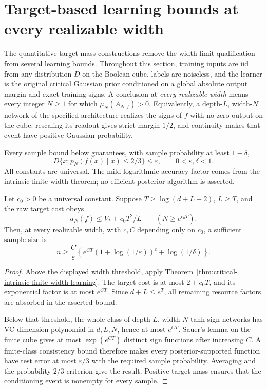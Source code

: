 \section{Target-based learning bounds at every realizable width}
\label{sec:critical-all-width-target-learning}

The quantitative target-mass constructions remove the width-limit
qualification from several learning bounds. Throughout this section,
training inputs are iid from any distribution $D$ on the Boolean cube,
labels are noiseless, and the learner is the original critical Gaussian
prior conditioned on a global absolute output margin and exact training
signs. A conclusion at \emph{every realizable width} means every integer
$N\ge1$ for which $\mu_N(A_{N,f})>0$. Equivalently, a depth-$L$,
width-$N$ network of the specified architecture realizes the signs of $f$
with no zero output on the cube: rescaling its readout gives strict margin
$1/2$, and continuity makes that event have positive Gaussian probability.

Every sample bound below guarantees, with sample probability at least
$1-\delta$,
\[
 D\{x:p_N(f(x)\mid x)\le2/3\}\le\varepsilon,
 \qquad 0<\varepsilon,\delta<1.
\]
All constants are universal. The mild logarithmic accuracy factor comes
from the intrinsic finite-width theorem; no efficient posterior algorithm
is asserted.

\begin{lemma}
\label{lem:critical-mass-to-all-width-learning}
Let $c_0>0$ be a universal constant. Suppose $T\ge\log(d+L+2)$,
$L\ge T$, and the raw target cost obeys
\[
 a_N(f)\le V_*+c_0T^2/L\qquad(N\ge e^{c_0T}).
\]
Then, at every realizable width, with $c,C$ depending only on $c_0$, a
sufficient sample size is
\[
 n\ge\frac C\varepsilon
   \left\{e^{CT}(1+\log(1/\varepsilon))^c+\log(1/\delta)\right\}.
\]
\end{lemma}

\begin{proof}
Above the displayed width threshold, apply
Theorem~\ref{thm:critical-intrinsic-finite-width-learning}.
The target cost is at most $2+c_0T$, and its exponential factor is at
most $e^{CT}$. Since $d+L\le e^T$, all remaining resource factors are
absorbed in the asserted bound.

Below that threshold, the whole class of depth-$L$, width-$N$ tanh sign
networks has VC dimension polynomial in $d,L,N$, hence at most $e^{CT}$.
Sauer's lemma on the finite cube gives at most $\exp(e^{CT})$ distinct
sign functions after increasing $C$. A finite-class consistency bound
therefore makes every posterior-supported function have test error at
most $\varepsilon/3$ with the required sample probability. Averaging
and the probability-$2/3$ criterion give the result. Positive target
mass ensures that the conditioning event is nonempty for every sample.
\end{proof}

